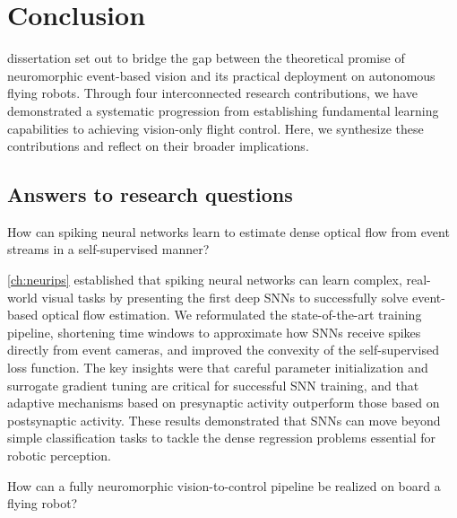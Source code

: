 \chapter{Conclusion}
\label{ch:conclusion}

 dissertation set out to bridge the gap between the theoretical promise of neuromorphic event-based vision and its practical deployment on autonomous flying robots. Through four interconnected research contributions, we have demonstrated a systematic progression from establishing fundamental learning capabilities to achieving vision-only flight control. Here, we synthesize these contributions and reflect on their broader implications.

\section{Answers to research questions}

\begin{tcolorbox}[title={\textbf{Research Question 1}}]
    How can spiking neural networks learn to estimate dense optical flow from event streams in a self-supervised manner?
\end{tcolorbox}

\cref{ch:neurips} established that spiking neural networks can learn complex, real-world visual tasks by presenting the first deep SNNs to successfully solve event-based optical flow estimation. We reformulated the state-of-the-art training pipeline, shortening time windows to approximate how SNNs receive spikes directly from event cameras, and improved the convexity of the self-supervised loss function. The key insights were that careful parameter initialization and surrogate gradient tuning are critical for successful SNN training, and that adaptive mechanisms based on presynaptic activity outperform those based on postsynaptic activity. These results demonstrated that SNNs can move beyond simple classification tasks to tackle the dense regression problems essential for robotic perception.

\begin{tcolorbox}[title={\textbf{Research Question 2}}]
    How can a fully neuromorphic vision-to-control pipeline be realized on board a flying robot?
\end{tcolorbox}

